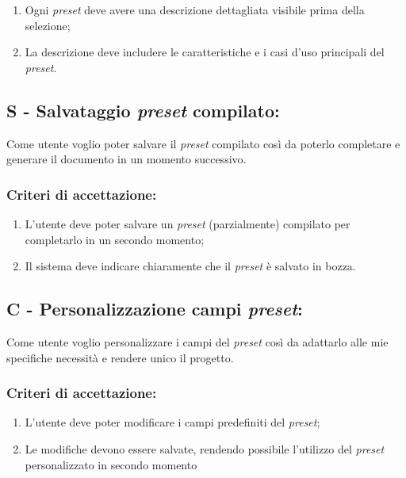 \begin{enumerate}
    \item Ogni \textit{preset} deve avere una descrizione dettagliata visibile prima della selezione;
    \item La descrizione deve includere le caratteristiche e i casi d'uso principali del \textit{preset}.
\end{enumerate}

\vspace{0.5cm}

\subsection*{S - Salvataggio \textit{preset} compilato:}

\noindent Come utente voglio poter salvare il \textit{preset} compilato così da poterlo completare e generare il documento in un momento successivo.

\subsubsection*{Criteri di accettazione:}

\begin{enumerate}
    \item L'utente deve poter salvare un \textit{preset} (parzialmente) compilato per completarlo in un secondo momento;
    \item Il sistema deve indicare chiaramente che il \textit{preset} è salvato in bozza.
\end{enumerate}

\vspace{0.5cm}

\pagebreak
\subsection*{C - Personalizzazione campi \textit{preset}:}

\noindent Come utente voglio personalizzare i campi del \textit{preset} così da adattarlo alle mie specifiche necessità e rendere unico il progetto. 

\subsubsection*{Criteri di accettazione:}

\begin{enumerate}
    \item L'utente deve poter modificare i campi predefiniti del \textit{preset};
    \item Le modifiche devono essere salvate, rendendo possibile l’utilizzo del \textit{preset} personalizzato in secondo momento
\end{enumerate}

